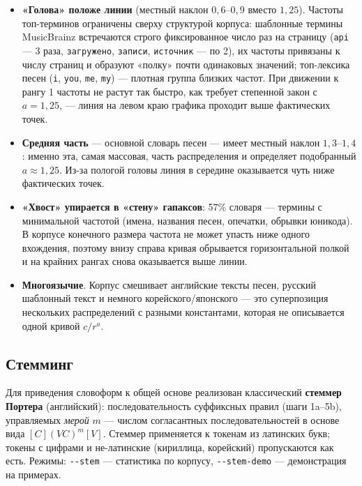 \begin{itemize}
    \item \textbf{«Голова» положе линии} (местный наклон $0{,}6$--$0{,}9$
    вместо $1{,}25$). Частоты топ-терминов ограничены сверху структурой
    корпуса: шаблонные термины MusicBrainz встречаются строго фиксированное
    число раз на страницу (\texttt{api} --- 3 раза,
    \texttt{загружено}, \texttt{записи}, \texttt{источник} --- по 2), их
    частоты привязаны к числу страниц и образуют «полку» почти одинаковых
    значений; топ-лексика песен (\texttt{i}, \texttt{you}, \texttt{me},
    \texttt{my}) --- плотная группа близких частот. При движении к рангу 1
    частоты не растут так быстро, как требует степенной закон с
    $a = 1{,}25$, --- линия на левом краю графика проходит выше фактических
    точек.
    \item \textbf{Средняя часть} --- основной словарь песен --- имеет
    местный наклон $1{,}3$--$1{,}4$: именно эта, самая массовая, часть
    распределения и определяет подобранный $a \approx 1{,}25$. Из-за пологой
    головы линия в середине оказывается чуть ниже фактических точек.
    \item \textbf{«Хвост» упирается в «стену» гапаксов}: 57\% словаря ---
    термины с минимальной частотой (имена, названия песен, опечатки,
    обрывки юникода). В корпусе конечного размера частота не может упасть
    ниже одного вхождения, поэтому внизу справа кривая обрывается
    горизонтальной полкой и на крайних рангах снова оказывается выше линии.
    \item \textbf{Многоязычие}. Корпус смешивает английские тексты песен,
    русский шаблонный текст и немного корейского/японского --- это
    суперпозиция нескольких распределений с разными константами, которая
    не описывается одной кривой $c/r^a$.
\end{itemize}

\subsection{Стемминг}
Для приведения словоформ к общей основе реализован классический
\textbf{стеммер Портера} (английский): последовательность суффиксных правил
(шаги 1a--5b), управляемых \emph{мерой} $m$ --- числом согласантных
последовательностей в основе вида $[C](VC)^m[V]$. Стеммер применяется к
токенам из латинских букв; токены с цифрами и не-латинские (кириллица,
корейский) пропускаются как есть. Режимы: \texttt{-{}-stem} --- статистика по
корпусу, \texttt{-{}-stem-demo} --- демонстрация на примерах.

